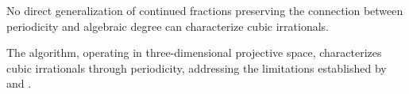 \begin{corollary}\label{cor:cf_insufficient}
No direct generalization of continued fractions preserving the connection between periodicity and algebraic degree can characterize cubic irrationals.
\end{corollary}

The \HAPD{} algorithm, operating in three-dimensional projective space, characterizes cubic irrationals through periodicity, addressing the limitations established by \cite{Khinchin1964} and \cite{Cassels1957}.
